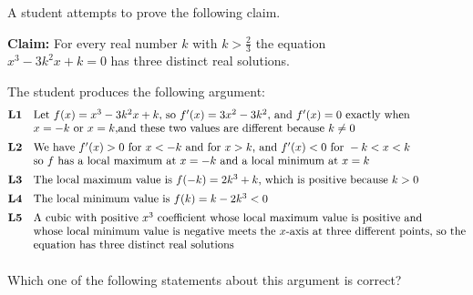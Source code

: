 \documentclass[11pt,a4paper]{article}
\begin{document}
\begin{enumerate}[label=\textbf{\arabic*.},leftmargin=*,itemsep=0pt,start=16]
A student attempts to prove the following claim.

\begin{center}
\begin{minipage}{0.82\linewidth}
\centering
\textbf{Claim:} For every real number $k$ with $k>\frac{2}{3}$ the equation \\ \qquad\qquad$x^3-3k^2x+k=0$ has three distinct real solutions.
\end{minipage}
\end{center}

The student produces the following argument:\\
\[
\begin{array}{@{}rl@{}}
\textbf{L1} & \text{Let } f(x)=x^3-3k^2x+k \text{, so } f'(x)=3x^2-3k^2 \text{, and } f'(x)=0 \text{ exactly when } \\ & x=-k \text{ or } x=k \text{,} 
  \text{and these two values are different because } k\neq0 \\[5pt]
\textbf{L2} & \text{We have } f'(x)>0 \text{ for } x<-k \text{ and for } x>k \text{, and } f'(x)<0 \text{ for } -k<x<k \\ & \text{so } f \text{ has a local maximum at } x=-k \text{ and a local minimum at } x=k \\[5pt]
\textbf{L3} & \text{The local maximum value is } f(-k)=2k^3+k \text{, which is positive because } k>0 \\[5pt]
\textbf{L4} & \text{The local minimum value is }
f(k)=k-2k^3<0\\[5pt]
\textbf{L5} & \text{A cubic with positive } x^3 \text{ coefficient whose local maximum value is positive and} \\
 & \text{whose local minimum value is negative meets the } x \text{-axis at three different points, so the} \\
 & \text{equation has three distinct real solutions}\\[5pt]
\end{array}
\]

Which one of the following statements about this argument is correct?


\end{enumerate}
\end{document}
